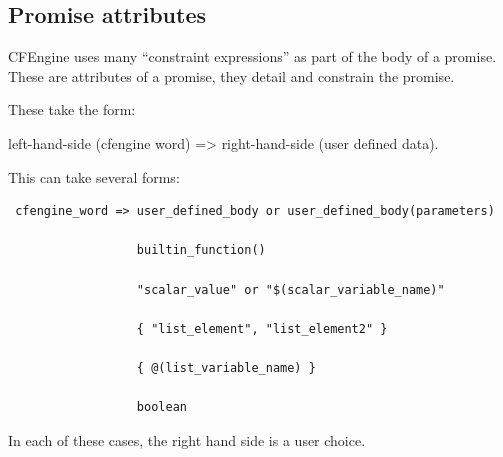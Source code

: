 \subsection{Promise attributes}

CFEngine uses many ``constraint expressions'' as part of the body of a
promise.  These are attributes of a promise, they detail and constrain
the promise.

These take the form:

left-hand-side (cfengine word) =\textgreater{} right-hand-side (user defined data).

This can take several forms:

\begin{verbatim}
 cfengine_word => user_defined_body or user_defined_body(parameters)

                  builtin_function()

                  "scalar_value" or "$(scalar_variable_name)"

                  { "list_element", "list_element2" }

                  { @(list_variable_name) }

                  boolean
\end{verbatim}

In each of these cases, the right hand side is a user choice.


